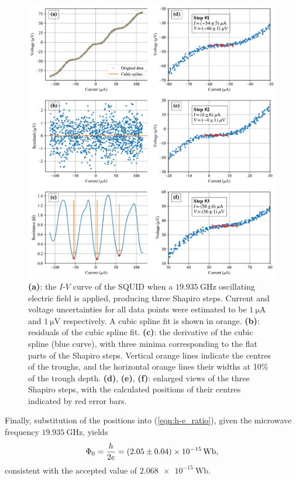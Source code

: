 \documentclass[twocol]{ametsocV6.1}
\begin{document}
\begin{figure}[ht]
	\centering%
	\includegraphics[width=\linewidth]{../figures/shapiro_steps.pdf}
	\caption{
		\textbf{(a)}: the $I$-$V$ curve of the SQUID when a
		$\SI{19.935}{\giga\hertz}$ oscillating electric field is applied,
		producing three Shapiro steps. Current and voltage uncertainties for
		all data points
		were estimated to be $\SI{1}{\micro\ampere}$ and $\SI{1}{\micro\volt}$
		respectively. A cubic spline fit is shown in orange.
		\textbf{(b)}: residuals of the cubic spline fit.
		\textbf{(c)}: the derivative of the cubic spline (blue curve),
		with three minima corresponding to the flat parts of the Shapiro steps.
		Vertical orange lines indicate the centres of the troughs,
		and the horizontal orange lines their widths at 10\% of the trough
		depth.
		\textbf{(d)}, \textbf{(e)}, \textbf{(f)}: enlarged views of the
		three Shapiro steps, with the calculated positions of their centres
		indicated by red error bars.
	}
	\label{fig:shapiro_steps}
\end{figure}

Finally, substitution of the positions into (\ref{eqn:h-e_ratio}),
given the microwave frequency $\SI{19.935}{\giga\hertz}$, yields
\begin{equation}
	\Phi_0 = \frac{h}{2e} = \SI{2.05 \pm 0.04 e-15}{\weber},
\end{equation}
consistent with the accepted value of $\SI{2.068e-15}{\weber}$.
\end{document}
